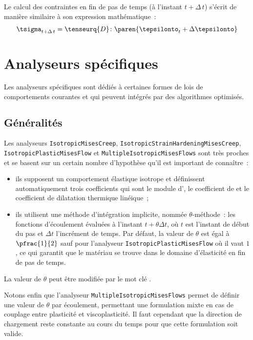 \documentclass[rectoverso,pleiades,pstricks,leqno,anti]{texmf/note_technique_2010}
\makeatletter
\newcommand{\mkey}[1]{\index{mkeys}{#1@\symbol{64}#1}{\texttt{@#1}}}
\makeatother
\begin{document}
Le calcul des contraintes en fin de pas de temps (à l'instant
\(t+\Delta\,t\)) s'écrit de manière similaire à son expression
mathématique~:
\[
\tsigma_{t+\Delta\,t} = \tenseurq{D}\colon\paren{\tepsilonto_{t}+\Delta\tepsilonto}
\]

\newpage
\clearpage
\section{Analyseurs spécifiques}

Les analyseurs spécifiques sont dédiés à certaines formes de lois de
comportements courantes et qui peuvent intégrés par des algorithmes
optimisés.

\subsection{Généralités}

Les analyseurs \texttt{Isotropic\-Mises\-Creep},
\texttt{Isotropic\-Strain\-Hardening\-Mises\-Creep},
\texttt{Isotropic\-Plastic\-Mises\-Flow} et
\texttt{Multiple\-Isotropic\-Mises\-Flows} sont très proches et se
basent sur un certain nombre d'hypothèse qu'il est important de
connaître~:
\begin{itemize}
  \item ils supposent un comportement élastique isotrope et définissent
  automatiquement trois coefficients qui sont le module d',
  le coefficient de  et le coefficient de dilatation
  thermique linéique~;
  \item ils utilisent une méthode d'intégration implicite, nommée
  \(\theta\)-méthode~: les fonctions d'écoulement évaluées à l'instant
  \(t+\theta\Delta t\), où \(t\) est l'instant de début du pas et
  \(\Delta t\) l'incrément de temps. Par défaut, la valeur de \(\theta\)
  est égal à \(\pfrac{1}{2}\) sauf pour l'analyseur
  \texttt{Isotropic\-Plastic\-Mises\-Flow} où il vaut \(1\), ce qui
  garantit que le matériau se trouve dans le domaine d'élasticité en fin
  de pas de temps.
\end{itemize}

La valeur de \(\theta\) peut être modifiée par le mot clé
\mkey{Theta}.

Notons enfin que l'analyseur \texttt{Multiple\-Isotropic\-Mises\-Flows}
permet de définir une valeur de \(\theta\) par écoulement, permettant
une formulation mixte en cas de couplage entre plasticité et
viscoplasticité. Il faut cependant que la direction de chargement reste
constante au cours du temps pour que cette formulation soit valide.
\end{document}
